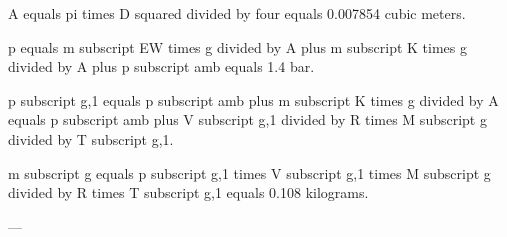 A equals pi times D squared divided by four equals 0.007854 cubic meters.  

p equals m subscript EW times g divided by A plus m subscript K times g divided by A plus p subscript amb equals 1.4 bar.  

p subscript g,1 equals p subscript amb plus m subscript K times g divided by A equals p subscript amb plus V subscript g,1 divided by R times M subscript g divided by T subscript g,1.  

m subscript g equals p subscript g,1 times V subscript g,1 times M subscript g divided by R times T subscript g,1 equals 0.108 kilograms.  

---